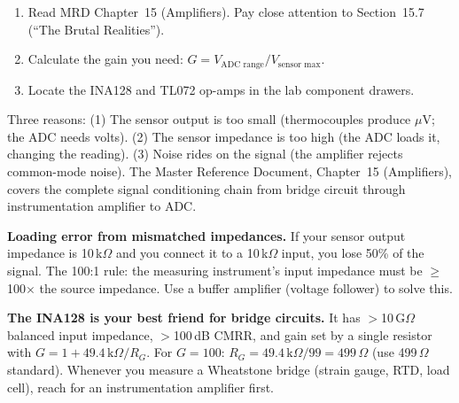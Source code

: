 \documentclass[11pt,letterpaper]{article}
\begin{document}
\begin{tcolorbox}[colback=minesblue!3, colframe=minesblue!40, boxrule=0.5pt, arc=2pt, left=6pt, right=6pt, top=3pt, bottom=3pt, fonttitle=\small\bfseries\color{minesblue}, title={Before You Start: Module 7}]
\small
\begin{enumerate}[nosep,leftmargin=*]
\item Read MRD Chapter~15 (Amplifiers). Pay close attention to Section~15.7 (``The Brutal Realities'').
\item Calculate the gain you need: $G = V_{\text{ADC range}} / V_{\text{sensor max}}$.
\item Locate the INA128 and TL072 op-amps in the lab component drawers.
\end{enumerate}
\end{tcolorbox}

\begin{faqbox}
Three reasons: (1) The sensor output is too small (thermocouples produce $\mu$V; the ADC needs volts). (2) The sensor impedance is too high (the ADC loads it, changing the reading). (3) Noise rides on the signal (the amplifier rejects common-mode noise). The Master Reference Document, Chapter~15 (Amplifiers), covers the complete signal conditioning chain from bridge circuit through instrumentation amplifier to ADC.
\end{faqbox}

\begin{warnbox}
\textbf{Loading error from mismatched impedances.} If your sensor output impedance is 10\,k$\Omega$ and you connect it to a 10\,k$\Omega$ input, you lose 50\% of the signal. The 100:1 rule: the measuring instrument's input impedance must be $\geq$100$\times$ the source impedance. Use a buffer amplifier (voltage follower) to solve this.
\end{warnbox}

\begin{protip}
\textbf{The INA128 is your best friend for bridge circuits.} It has $>$10\,G$\Omega$ balanced input impedance, $>$100\,dB CMRR, and gain set by a single resistor with $G = 1 + 49.4\,\text{k}\Omega/R_G$. For $G=100$: $R_G = 49.4\,\text{k}\Omega/99 = 499\,\Omega$ (use 499\,$\Omega$ standard). Whenever you measure a Wheatstone bridge (strain gauge, RTD, load cell), reach for an instrumentation amplifier first.
\end{protip}

\end{document}
